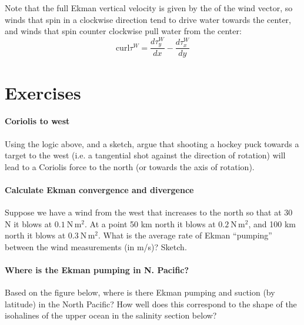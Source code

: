 Note that the full Ekman vertical velocity is given by the  of the  wind vector, so winds that spin in a clockwise direction tend to drive water towards the center, and winds that spin counter clockwise pull water from the center:
\begin{equation}
    \mathrm{curl} \tau^W = \frac{d \tau^W_y}{d x}-\frac{d \tau^W_x}{d y}
\end{equation}

\clearpage
\section{Exercises}

\paragraph{Coriolis to west}
Using the logic above, and a sketch, argue that shooting a hockey puck towards a target to the west (i.e. a tangential shot against the direction of rotation) will lead to a Coriolis force to the north (or towards the axis of rotation).  

\paragraph{Calculate Ekman convergence and divergence} Suppose we have a wind from the west that increases to the north so that at 30 N it blows at $0.1\ \mathrm{N\,m^2}$.  At a point 50 km north it blows at  $0.2\ \mathrm{N\,m^2}$, and 100 km north it blows at  $0.3\ \mathrm{N\,m^2}$. What is the average rate of Ekman ``pumping'' between the wind measurements (in m/s)? Sketch.

\paragraph{Where is the Ekman pumping in N. Pacific?}

Based on the figure below, where is there Ekman pumping and suction (by latitude) in the North Pacific? How well does this correspond to the shape of the isohalines of the upper ocean in the salinity section below?

